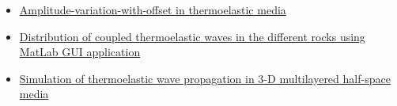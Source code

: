 \documentclass{article}
\begin{document}
    
    \begin{itemize}
        \item \href{https://ricerca.ogs.it/retrieve/a16968a5-6f6f-496e-819f-d244ff797fbd/hou-et-al-2023-amplitude-variation-with-offset-in-thermoelastic-media.pdf}{Amplitude-variation-with-offset in thermoelastic media}
    \end{itemize}

    
    \begin{itemize}
        \item \href{https://ceur-ws.org/Vol-3966/W1Paper2.pdf}{Distribution of coupled thermoelastic waves in the different rocks using MatLab GUI application}
    \end{itemize}


    \begin{itemize}
        \item \href{https://academic.oup.com/gji/article/232/2/1408/6761682?login=false}{Simulation of thermoelastic wave propagation in 3-D multilayered half-space media}
    \end{itemize}
\end{document}

